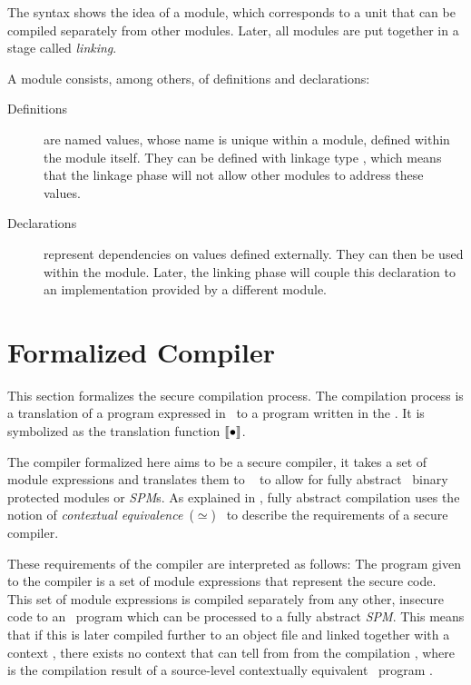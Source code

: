 The syntax shows the idea of a module, which corresponds to a unit that can be compiled separately from other modules.
Later, all modules are put together in a stage called \emph{linking}.

A module consists, among others, of definitions and declarations:
\begin{description}
\item[Definitions] are named values, whose name is unique within a module, defined within the module itself.
They can be defined with linkage type , which means that the linkage phase will not allow other modules to address these values.
\item[Declarations] represent dependencies on values defined externally.
They can then be used within the module.
Later, the linking phase will couple this declaration to an implementation provided by a different module.
\end{description}
\clearpage
\section{Formalized Compiler}
\label{sec:formalizedcompiler}
This section formalizes the secure compilation process.
The compilation process is a translation of a program  expressed in \MiniML\ to a program written in the \LLVMIR.
It is symbolized as the translation function $\llbracket\bullet\rrbracket$.

The compiler formalized here aims to be 
a secure compiler, it takes a set of module expressions and translates them to \LLVMIR\
to allow for fully abstract~\cite{Abadi,Agten:2012:SCM:2354412.2355247} binary protected modules or \emph{SPM}s.
As explained in \myref{sec}{sec:fullabstraction}, fully abstract compilation uses the notion of \emph{contextual equivalence}~($\simeq$)~\cite{Agten:2012:SCM:2354412.2355247} to describe the requirements of a secure compiler.

These requirements of the compiler are interpreted as follows: The program  given to the compiler is a set of module expressions  that represent the secure code.
This set of module expressions \cmath{me} is compiled separately from any other, insecure code to an \LLVMIR\ program \cmath{\compiled{P}} which can be processed to a fully abstract \emph{SPM}.
This means that if this \cmath{\compiled{P}} is later compiled further to an object file and linked together with a context , there exists no context  that can tell from  from the compilation , where  is the compilation result of a source-level contextually equivalent \MiniML\ program .

